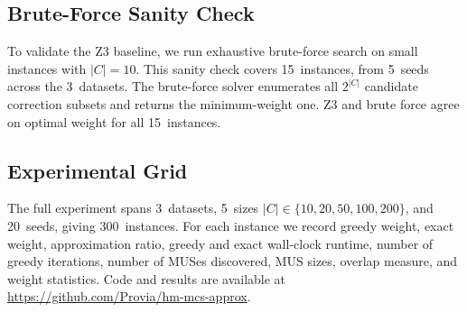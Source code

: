 \subsection{Brute-Force Sanity Check}

To validate the Z3 baseline, we run exhaustive brute-force search on small
instances with $|C| = 10$.
This sanity check covers 15~instances, from 5~seeds across the 3~datasets.
The brute-force solver enumerates all $2^{|C|}$ candidate correction subsets
and returns the minimum-weight one.
Z3 and brute force agree on optimal weight for all 15~instances.

\subsection{Experimental Grid}

The full experiment spans 3~datasets, 5~sizes
$|C| \in \{10, 20, 50, 100, 200\}$, and 20~seeds, giving 300~instances.
For each instance we record greedy weight, exact weight, approximation ratio,
greedy and exact wall-clock runtime, number of greedy iterations, number of
MUSes discovered, MUS sizes, overlap measure, and weight statistics.
Code and results are available at
\url{https://github.com/Provia/hm-mcs-approx}.
